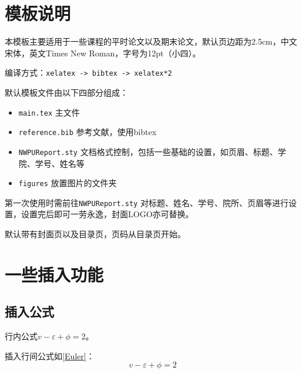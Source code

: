 \documentclass[12pt,hyperref,a4paper,UTF8,fontset=fandol]{ctexart}
\begin{document}
\cover

%
%

\thispagestyle{empty} %

\newpage
\tableofcontents

\newpage


\section{模板说明}
本模板主要适用于一些课程的平时论文以及期末论文，默认页边距为2.5cm，中文宋体，英文Times New Roman，字号为12pt（小四）。

编译方式：\verb|xelatex -> bibtex -> xelatex*2|


默认模板文件由以下四部分组成：
\begin{itemize}
    \item \texttt{main.tex} 主文件
    \item \texttt{reference.bib} 参考文献，使用bibtex
    \item \texttt{NWPUReport.sty} 文档格式控制，包括一些基础的设置，如页眉、标题、学院、学号、姓名等
    \item \texttt{figures} 放置图片的文件夹
\end{itemize}

第一次使用时需前往\texttt{NWPUReport.sty} 对标题、姓名、学号、院所、页眉等进行设置，设置完后即可一劳永逸，封面LOGO亦可替换。

默认带有封面页以及目录页，页码从目录页开始。

\section{一些插入功能}
\subsection{插入公式}
行内公式$v-\varepsilon+\phi=2$。

插入行间公式如\autoref{Euler}：
\begin{equation}
    v-\varepsilon+\phi=2
    \label{Euler}
\end{equation}
\end{document}
